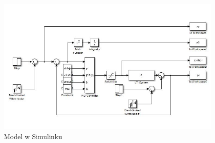 \begin{figure}[H]
	\centering
	\includegraphics[width=140mm]{ClosedLoopModel.jpg}
	\caption{Model w Simulinku}
	\label{fig:model_simulink}
\end{figure}

